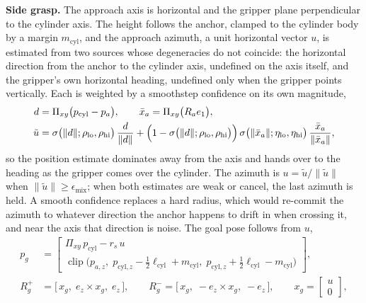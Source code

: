 \textbf{Side grasp.} The approach axis is horizontal and the gripper plane perpendicular to the cylinder axis. The height follows the anchor, clamped to the cylinder body by a margin $m_{\text{cyl}}$, and the approach azimuth, a unit horizontal vector $u$, is estimated from two sources whose degeneracies do not coincide: the horizontal direction from the anchor to the cylinder axis, undefined on the axis itself, and the gripper's own horizontal heading, undefined only when the gripper points vertically. Each is weighted by a smoothstep confidence on its own magnitude,
\begin{equation}
\begin{split}
d &= \Pi_{xy}\bigl(p_{\text{cyl}} - p_a\bigr), \qquad \bar{x}_a = \Pi_{xy}\bigl(R_a e_1\bigr),\\
\tilde{u} &= \sigma\bigl(\|d\|; \rho_{\text{lo}}, \rho_{\text{hi}}\bigr)\,\frac{d}{\|d\|}
+ \Bigl(1 - \sigma\bigl(\|d\|; \rho_{\text{lo}}, \rho_{\text{hi}}\bigr)\Bigr)\,\sigma\bigl(\|\bar{x}_a\|; \eta_{\text{lo}}, \eta_{\text{hi}}\bigr)\,\frac{\bar{x}_a}{\|\bar{x}_a\|},
\end{split}
\label{eq:sideaz}
\end{equation}
so the position estimate dominates away from the axis and hands over to the heading as the gripper comes over the cylinder. The azimuth is $u = \tilde{u}/\|\tilde{u}\|$ when $\|\tilde{u}\| \ge \epsilon_{\text{mix}}$; when both estimates are weak or cancel, the last azimuth is held. A smooth confidence replaces a hard radius, which would re-commit the azimuth to whatever direction the anchor happens to drift in when crossing it, and near the axis that direction is noise. The goal pose follows from $u$,
\begin{equation}
\begin{split}
p_g &= \begin{bmatrix} \Pi_{xy}\,p_{\text{cyl}} - r_s\,u \\ \operatorname{clip}\bigl(p_{a,z},\; p_{\text{cyl},z} - \tfrac{1}{2}\ell_{\text{cyl}} + m_{\text{cyl}},\; p_{\text{cyl},z} + \tfrac{1}{2}\ell_{\text{cyl}} - m_{\text{cyl}}\bigr)\end{bmatrix},\\
R_g^{+} &= \bigl[\,x_g,\; e_z \times x_g,\; e_z\,\bigr],
\qquad
R_g^{-} = \bigl[\,x_g,\; -e_z \times x_g,\; -e_z\,\bigr],
\qquad x_g = \begin{bmatrix} u \\ 0 \end{bmatrix},
\end{split}
\label{eq:sidegoal}
\end{equation}
